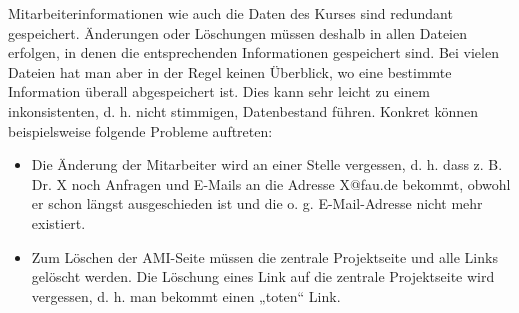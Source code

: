 \documentclass{lehramt-informatik}
\begin{document}
\begin{enumerate}
\begin{antwort}[muster]
Mitarbeiterinformationen wie auch die Daten des Kurses sind redundant
gespeichert. Änderungen oder Löschungen müssen deshalb in allen Dateien
erfolgen, in denen die entsprechenden Informationen gespeichert sind.
Bei vielen Dateien hat man aber in der Regel keinen Überblick, wo eine
bestimmte Information überall abgespeichert ist. Dies kann sehr leicht
zu einem inkonsistenten, d. h. nicht stimmigen, Datenbestand führen.
Konkret können beispielsweise folgende Probleme auftreten:

\begin{itemize}
\item Die Änderung der Mitarbeiter wird an einer Stelle vergessen, d. h.
dass z. B. Dr. X noch Anfragen und E-Mails an die Adresse X@fau.de
bekommt, obwohl er schon längst ausgeschieden ist und die o. g.
E-Mail-Adresse nicht mehr existiert.

\item Zum Löschen der AMI-Seite müssen die zentrale Projektseite und
alle Links gelöscht werden. Die Löschung eines Link auf die zentrale
Projektseite wird vergessen, d. h. man bekommt einen „toten“ Link.
\end{itemize}
\end{antwort}
\end{enumerate}

\literatur
\end{document}
